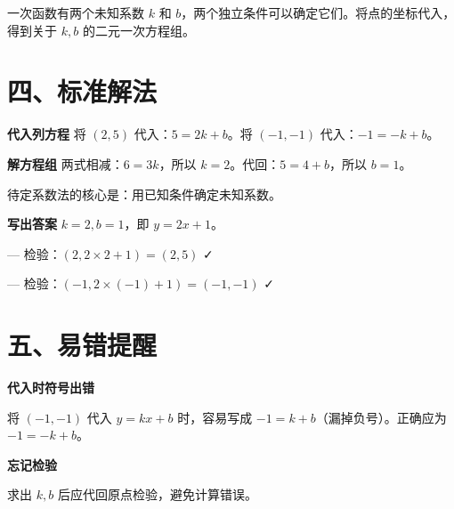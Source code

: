 \documentclass{exam-zh}
\begin{document}
\begin{keyideabox}
  一次函数有两个未知系数 $k$ 和 $b$，两个独立条件可以确定它们。将点的坐标代入，得到关于 $k, b$ 的二元一次方程组。
\end{keyideabox}



\section*{四、标准解法}


\begin{keyideabox}
  \textbf{代入列方程}
  将 $(2,5)$ 代入：$5 = 2k + b$。将 $(-1,-1)$ 代入：$-1 = -k + b$。
\end{keyideabox}




\begin{keyideabox}
  \textbf{解方程组}
  两式相减：$6 = 3k$，所以 $k = 2$。代回：$5 = 4 + b$，所以 $b = 1$。
\par\small 待定系数法的核心是：用已知条件确定未知系数。\end{keyideabox}




\begin{keyideabox}
  \textbf{写出答案}
  $k = 2, b = 1$，即 $y = 2x + 1$。
  \par\hspace{5mm}\small — 检验：$(2, 2\times2+1) = (2,5)$ ✓
  \par\hspace{5mm}\small — 检验：$(-1, 2\times(-1)+1) = (-1,-1)$ ✓
\end{keyideabox}



\section*{五、易错提醒}


\begin{mistakebox}
\textbf{代入时符号出错}\par  将 $(-1,-1)$ 代入 $y=kx+b$ 时，容易写成 $-1 = k + b$（漏掉负号）。正确应为 $-1 = -k + b$。
\end{mistakebox}




\begin{mistakebox}
\textbf{忘记检验}\par  求出 $k, b$ 后应代回原点检验，避免计算错误。
\end{mistakebox}
\end{document}
